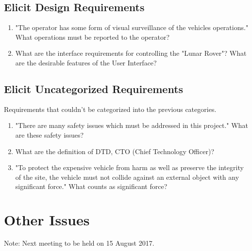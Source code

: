 \documentclass[11pt, a4paper]{article}
\begin{document}
\begin{flushleft}
\begin{enumerate}
  \end{enumerate}


  \subsection{Elicit Design Requirements}

  \begin{enumerate}
    \item "The operator has some form of visual surveillance of the vehicles operations."
    \linebreak What operations must be reported to the operator?
    
    \item What are the interface requirements for controlling the "Lunar Rover"?
    \linebreak What are the desirable features of the User Interface?
  \end{enumerate}


  \subsection{Elicit Uncategorized Requirements}
  Requirements that couldn't be categorized into the previous categories.
  
  \begin{enumerate}

  \item "There are many safety issues which must be addressed in this project."
  \linebreak What are these safety issues?
  
  \item What are the definition of DTD, CTO (Chief Technology Officer)?

  \item "To protect the expensive vehicle from harm as well as preserve the integrity of the site, the vehicle must not collide against an external object with any significant force."
  \linebreak What counts as significant force?

  \end{enumerate}

  \section{Other Issues}

\end{flushleft}
  \vspace*{10pt}
  \noindent Note: Next meeting to be held on 15 August 2017.


  
\end{document}
